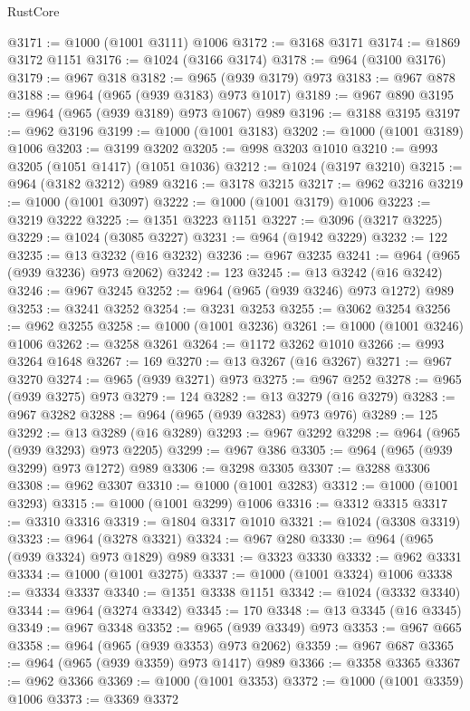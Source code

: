 \begin{lexlean}{RustCore}
\begin{coremodule}
@3171 := @1000 (@1001 @3111) @1006
@3172 := @3168 @3171
@3174 := @1869 @3172 @1151
@3176 := @1024 (@3166 @3174)
@3178 := @964 (@3100 @3176)
@3179 := @967 @318
@3182 := @965 (@939 @3179) @973
@3183 := @967 @878
@3188 := @964 (@965 (@939 @3183) @973 @1017)
@3189 := @967 @890
@3195 := @964 (@965 (@939 @3189) @973 @1067) @989
@3196 := @3188 @3195
@3197 := @962 @3196
@3199 := @1000 (@1001 @3183)
@3202 := @1000 (@1001 @3189) @1006
@3203 := @3199 @3202
@3205 := @998 @3203 @1010
@3210 := @993 @3205 (@1051 @1417) (@1051 @1036)
@3212 := @1024 (@3197 @3210)
@3215 := @964 (@3182 @3212) @989
@3216 := @3178 @3215
@3217 := @962 @3216
@3219 := @1000 (@1001 @3097)
@3222 := @1000 (@1001 @3179) @1006
@3223 := @3219 @3222
@3225 := @1351 @3223 @1151
@3227 := @3096 (@3217 @3225)
@3229 := @1024 (@3085 @3227)
@3231 := @964 (@1942 @3229)
@3232 := 122
@3235 := @13 @3232 (@16 @3232)
@3236 := @967 @3235
@3241 := @964 (@965 (@939 @3236) @973 @2062)
@3242 := 123
@3245 := @13 @3242 (@16 @3242)
@3246 := @967 @3245
@3252 := @964 (@965 (@939 @3246) @973 @1272) @989
@3253 := @3241 @3252
@3254 := @3231 @3253
@3255 := @3062 @3254
@3256 := @962 @3255
@3258 := @1000 (@1001 @3236)
@3261 := @1000 (@1001 @3246) @1006
@3262 := @3258 @3261
@3264 := @1172 @3262 @1010
@3266 := @993 @3264 @1648
@3267 := 169
@3270 := @13 @3267 (@16 @3267)
@3271 := @967 @3270
@3274 := @965 (@939 @3271) @973
@3275 := @967 @252
@3278 := @965 (@939 @3275) @973
@3279 := 124
@3282 := @13 @3279 (@16 @3279)
@3283 := @967 @3282
@3288 := @964 (@965 (@939 @3283) @973 @976)
@3289 := 125
@3292 := @13 @3289 (@16 @3289)
@3293 := @967 @3292
@3298 := @964 (@965 (@939 @3293) @973 @2205)
@3299 := @967 @386
@3305 := @964 (@965 (@939 @3299) @973 @1272) @989
@3306 := @3298 @3305
@3307 := @3288 @3306
@3308 := @962 @3307
@3310 := @1000 (@1001 @3283)
@3312 := @1000 (@1001 @3293)
@3315 := @1000 (@1001 @3299) @1006
@3316 := @3312 @3315
@3317 := @3310 @3316
@3319 := @1804 @3317 @1010
@3321 := @1024 (@3308 @3319)
@3323 := @964 (@3278 @3321)
@3324 := @967 @280
@3330 := @964 (@965 (@939 @3324) @973 @1829) @989
@3331 := @3323 @3330
@3332 := @962 @3331
@3334 := @1000 (@1001 @3275)
@3337 := @1000 (@1001 @3324) @1006
@3338 := @3334 @3337
@3340 := @1351 @3338 @1151
@3342 := @1024 (@3332 @3340)
@3344 := @964 (@3274 @3342)
@3345 := 170
@3348 := @13 @3345 (@16 @3345)
@3349 := @967 @3348
@3352 := @965 (@939 @3349) @973
@3353 := @967 @665
@3358 := @964 (@965 (@939 @3353) @973 @2062)
@3359 := @967 @687
@3365 := @964 (@965 (@939 @3359) @973 @1417) @989
@3366 := @3358 @3365
@3367 := @962 @3366
@3369 := @1000 (@1001 @3353)
@3372 := @1000 (@1001 @3359) @1006
@3373 := @3369 @3372

\end{coremodule}
\end{lexlean}
